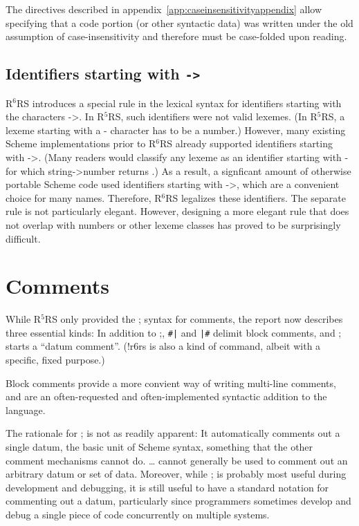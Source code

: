 \documentclass[twoside,twocolumn]{algol60}
\newcommand{\rn}[1]{R$^{#1}$RS}
\begin{document}
The directives described in appendix~\ref{app:caseinsensitivityappendix}
allow specifying that a code portion (or other syntactic data) was
written under the old assumption of case-insensitivity and therefore
must be case-folded upon reading.

\subsection{Identifiers starting with {\tt ->}}

\rn{6} introduces a special rule in the lexical syntax for
identifiers starting with the characters {\cf ->}.  In \rn{5}, such
identifiers were not valid lexemes.  (In \rn{5}, a lexeme starting
with a {\cf -} character has to be a number.)  However, many existing
Scheme implementations prior to \rn{6} already supported identifiers
starting with {\cf ->}.  (Many readers would classify any lexeme as an
identifier starting with {\cf -} for which {\cf string->number}
returns \schfalse{}.)  As a result, a signficant amount of otherwise
portable Scheme code used identifiers starting with {\cf ->}, which
are a convenient choice for many names.  Therefore, \rn{6} legalizes
these identifiers.  The separate rule is not particularly elegant.
However, designing a more elegant rule that does not overlap with
numbers or other lexeme classes has proved to be surprisingly
difficult.

 
\section{Comments}

While \rn{5} only provided the {\cf;} syntax for comments, the report
now describes three essential kinds: In addition to {\cf;}, {\tt \#|}
and {\tt |\#} delimit block comments, and {\cf\sharpsign;} starts a
``datum comment''.  ({\cf\sharpsign!r6rs} is also a kind of command,
albeit with a specific, fixed purpose.) 

Block comments provide a more convient way of writing multi-line
comments, and are an often-requested and often-implemented syntactic
addition to the language. 

The rationale for {\cf\sharpsign;} is not as readily apparent: It
automatically comments out a single datum, the basic unit of Scheme
syntax, something that the other comment mechanisms cannot do.  {\cf
  \sharpsign\verticalbar} \ldots {\cf \verticalbar\sharpsign} cannot
generally be used to comment out an arbitrary datum or set of data.
Moreover, while {\cf\sharpsign;} is probably most useful during
development and debugging, it is still useful to have a standard
notation for commenting out a datum, particularly since programmers
sometimes develop and debug a single piece of code concurrently on
multiple systems.
\end{document}
